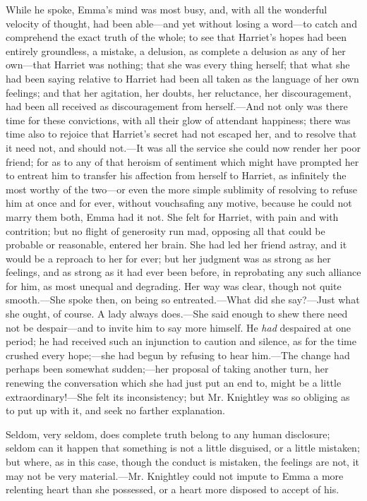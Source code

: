 While he spoke, Emma's mind was most busy, and, with all the wonderful velocity of thought, had been able---and yet without losing a word---to catch and comprehend the exact truth of the whole; to see that Harriet's hopes had been entirely groundless, a mistake, a delusion, as complete a delusion as any of her own---that Harriet was nothing; that she was every thing herself; that what she had been saying relative to Harriet had been all taken as the language of her own feelings; and that her agitation, her doubts, her reluctance, her discouragement, had been all received as discouragement from herself.---And not only was there time for these convictions, with all their glow of attendant happiness; there was time also to rejoice that Harriet's secret had not escaped her, and to resolve that it need not, and should not.---It was all the service she could now render her poor friend; for as to any of that heroism of sentiment which might have prompted her to entreat him to transfer his affection from herself to Harriet, as infinitely the most worthy of the two---or even the more simple sublimity of resolving to refuse him at once and for ever, without vouchsafing any motive, because he could not marry them both, Emma had it not. She felt for Harriet, with pain and with contrition; but no flight of generosity run mad, opposing all that could be probable or reasonable, entered her brain. She had led her friend astray, and it would be a reproach to her for ever; but her judgment was as strong as her feelings, and as strong as it had ever been before, in reprobating any such alliance for him, as most unequal and degrading. Her way was clear, though not quite smooth.---She spoke then, on being so entreated.---What did she say?---Just what she ought, of course. A lady always does.---She said enough to shew there need not be despair---and to invite him to say more himself. He {\em had} despaired at one period; he had received such an injunction to caution and silence, as for the time crushed every hope;---she had begun by refusing to hear him.---The change had perhaps been somewhat sudden;---her proposal of taking another turn, her renewing the conversation which she had just put an end to, might be a little extraordinary!---She felt its inconsistency; but Mr. Knightley was so obliging as to put up with it, and seek no farther explanation.

Seldom, very seldom, does complete truth belong to any human disclosure; seldom can it happen that something is not a little disguised, or a little mistaken; but where, as in this case, though the conduct is mistaken, the feelings are not, it may not be very material.---Mr. Knightley could not impute to Emma a more relenting heart than she possessed, or a heart more disposed to accept of his.

